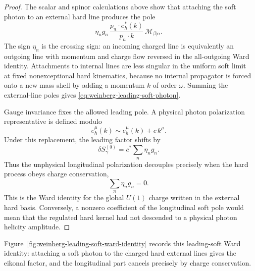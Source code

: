 \begin{proof}
The scalar and spinor calculations above show that attaching the soft photon
to an external hard line produces the pole
\[
  \eta_n g_n\,
  \frac{p_n\cdot e_h^*(k)}{p_n\cdot k}\,
  \mathcal M_{\beta|\alpha}.
\]
The sign \(\eta_n\) is the crossing sign: an incoming charged line is
equivalently an outgoing line with momentum and charge flow reversed in the
all-outgoing Ward identity.  Attachments to internal lines are less singular
in the uniform soft limit at fixed nonexceptional hard kinematics, because no
internal propagator is forced onto a new mass shell by adding a momentum
\(k\) of order \(\omega\).  Summing the external-line poles gives
\eqref{eq:weinberg-leading-soft-photon}.

Gauge invariance fixes the allowed leading pole.  A physical photon
polarization representative is defined modulo
\[
  e^\mu_h(k)\sim e^\mu_h(k)+c\,k^\mu .
\]
Under this replacement, the leading factor shifts by
\[
  \delta S_\gamma^{(0)}
  =
  c^*
  \sum_n\eta_n g_n .
\]
Thus the unphysical longitudinal polarization decouples precisely when the
hard process obeys charge conservation,
\[
  \sum_n\eta_n g_n=0.
\]
This is the Ward identity for the global \(U(1)\) charge written in the
external hard basis.  Conversely, a nonzero coefficient of the longitudinal
soft pole would mean that the regulated hard kernel had not descended to a
  physical photon helicity amplitude.
\end{proof}

Figure~\ref{fig:weinberg-leading-soft-ward-identity} records this leading-soft
Ward identity: attaching a soft photon to the charged hard external lines gives
the eikonal factor, and the longitudinal part cancels precisely by charge
conservation.


